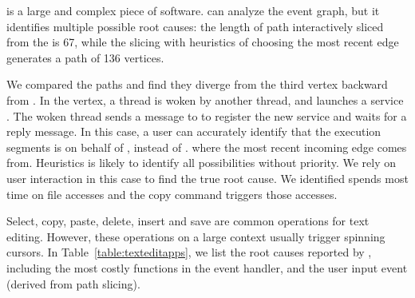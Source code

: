 
 is a large and complex piece of software. \xxx can analyze
the event graph, but it identifies multiple possible root causes: the length of
path interactively sliced from the \spinningnode is 67, while the slicing with
heuristics of choosing the most recent edge generates a path of 136 vertices.

We compared the paths and find they diverge from the third vertex backward
from \spinningnode. In the vertex, a  thread is
woken by another  thread, and launches a service
. The woken thread sends a message
to  to register the new service and waits for a reply message. In
this case, a user can accurately identify that the execution segments is on
behalf of , instead of . where the most recent
incoming edge comes from. Heuristics is likely to identify all possibilities
without priority. We rely on user interaction in this case to find the true root
cause. We identified  spends most time on file accesses and
the copy command triggers those accesses.



Select, copy, paste, delete, insert and save are common operations for text
editing. However, these operations on a large context usually trigger spinning
cursors. In Table~\ref{table:texteditapps}, we list the root causes reported by
\xxx, including the most costly functions in the event handler, and the user
input event (derived from path slicing).

